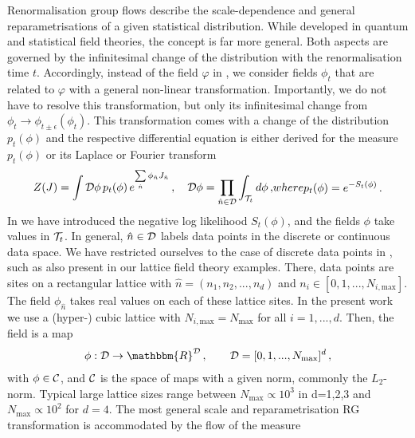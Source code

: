 \documentclass[reprint,amsmath,amssymb,aps,pra,superscriptaddress,nofootinbib,twocolumn,floatfix,nolongbibliography]{revtex4-2}
\begin{document}
Renormalisation group flows describe the scale-dependence and general reparametrisations of a given statistical distribution. While developed in quantum and statistical field theories, the concept is far more general. Both aspects are governed by the infinitesimal change of the distribution with the renormalisation time $t$. Accordingly, instead of the field $\varphi$ in , we consider fields $\phi_t$ that are related to $\varphi$ with a general non-linear transformation. Importantly, we do not have to resolve this transformation, but only its infinitesimal change from $\phi_t \to \phi_{t\pm\epsilon}(\phi_t)$. This transformation comes with a change of the distribution $p_t(\phi)$ and the respective differential equation is either derived for the measure $p_t(\phi)$ or its Laplace or Fourier transform 
%
\begin{subequations} 
	\label{eq:Zpphi}
%
\begin{align} 
Z(J)= \int {\cal D} \phi \,p_t(\phi) \,e^{ \sum\limits_{\hat n} \phi_{\hat n} J_{\hat n}}  \,, \quad {\cal D}\phi=\prod_{\hat n\in {\cal D}}\int_{{\cal T}_t} d\phi\,, 
\label{eq:ZpphiEq}
\end{align}
% 
where 
%
\begin{align} 
	p_t(\phi) = e^{-S_t(\phi)}\,. 
	\label{eq:p(phi)}
\end{align}
%
\end{subequations} 
%
In  we have introduced the negative log likelihood $S_t(\phi)$, and the fields $\phi$ take values in ${\cal T}_t$. In general, $\hat n\in{\cal D}$ labels data points in the discrete or continuous data space. We have restricted ourselves to the case of discrete data points in , such as also present in our lattice field theory examples. There, data points are sites on a rectangular lattice with $\hat n =(n_1,n_2,...,n_d)$ and $n_i\in [0,1,...,N_{i,\textrm{max}}]$. The field $\phi_{\hat n}$ takes real values on each of these lattice sites. In the present work we use a (hyper-) cubic lattice with $N_{i,\textrm{max}}=N_\textrm{max}$ for all $i=1,...,d$. Then, the field is a map 
%
\begin{align} 
\phi: {\cal D}\to \mathbbm{R}^{\cal D}\,,\qquad 	{\cal D} = [0,1,...,N_{\textrm{max}}]^d\,, 
\label{eq:phiMap}
\end{align} 
%
with $\phi \in {\cal C}$, and ${\cal C}$ is the space of maps  with a given norm, commonly the $L_2$-norm. Typical large lattice sizes range between $N_\textrm{max} \propto 10^3$ in d=1,2,3 and $N_\textrm{max}\propto 10^2$ for $d=4$. The most general scale and reparametrisation RG transformation is accommodated by the flow of the measure 
\end{document}
